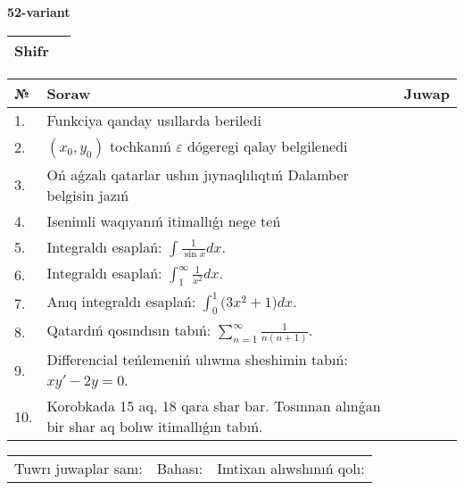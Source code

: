 \documentclass{article}
\begin{document}
  \egroup
  
  \newpage
  
  
  \textbf{52-variant}\\
  
  \bgroup
  \def\arraystretch{1.6} %
  
  \begin{tabular}{|m{5.7cm}|m{9.5cm}|}
  \hline
  Shifr & \\
  \hline
  \end{tabular}
  
  \vspace{1cm}
  
  \begin{tabular}{|m{0.7cm}|m{10cm}|m{4cm}|}
  \hline
  № & Soraw & Juwap \\
  \hline
  1. & Funkciya qanday usıllarda beriledi &  \\
  \hline
  2. & \((x_0,y_0)\) tochkanıń \(\varepsilon\) dógeregi qalay belgilenedi &  \\
  \hline
  3. & Oń aǵzalı qatarlar ushın jıynaqlılıqtıń Dalamber belgisin jazıń &  \\
  \hline
  4. & Isenimli waqıyanıń itimallıǵı nege teń &  \\
  \hline
  5. & Integraldı esaplań: \(\int{\frac{1}{\sin x}dx}\). &  \\
  \hline
  6. & Integraldı esaplań: \(\int_{1}^{\infty}{\frac{1}{x^2 }dx}\). &  \\
  \hline
  7. & Anıq integraldı esaplań: \(\int_{0}^{1}{(3x^2 } + 1)dx\). &  \\
  \hline
  8. & Qatardıń qosındısın tabıń: \(\sum_{n = 1}^{\infty}\frac{1}{n(n + 1)}\). &  \\
  \hline
  9. & Differencial teńlemeniń ulıwma sheshimin tabıń: \(xy' - 2y = 0\). &  \\
  \hline
  10. & Korobkada 15 aq, 18 qara shar bar. Tosınnan alınǵan bir shar aq bolıw itimallıǵın tabıń. &  \\
  \hline
  \end{tabular}
  
  \vspace{1cm}
  
  \begin{tabular}{lll}
  Tuwrı juwaplar sanı: \underline{\hspace{1.5cm}} & 
  Bahası: \underline{\hspace{1.5cm}} & 
  Imtixan alıwshınıń qolı: \underline{\hspace{2cm}} \\
  \end{tabular}
  
\end{document}
